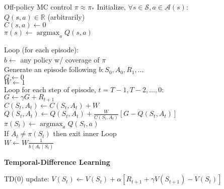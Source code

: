 \documentclass[twocolumn]{article}
\DeclareMathOperator*{\argmax}{argmax}
\begin{document}
\begin{mydef}{Off-policy MC control $\pi \approx \pi_*$}{}
    Initialize, $\forall s \in \mathcal S, a \in \mathcal A(s)$: \\
        \hspace*{2em}$Q(s,a) \in \mathbb R$ (arbitrarily) \\
        \hspace*{2em}$C(s,a) \leftarrow 0$ \\
        \hspace*{2em}$\pi(s) \leftarrow \argmax_a Q(s, a)$
    
        Loop (for each episode): \\
            \hspace*{2em}$b\leftarrow$ any policy w/ coverage of $\pi$ \\
            \hspace*{2em}Generate an episode following $b: S_0, A_0, R_1, \dots$ \\
            \hspace*{2em}$G \leftarrow 0$ \\
            \hspace*{2em}$W \leftarrow 1$ \\
            \hspace*{2em}Loop for each step of episode, $t = T-1, T-2, \dots, 0$: \\
                \hspace*{4em}$G \leftarrow \gamma G + R_{t+1}$ \\
                \hspace*{4em}$C(S_t, A_t) \leftarrow C(S_t, A_t) + W$ \\
                \hspace*{4em}$Q(S_t, A_t) \leftarrow Q(S_t, A_t) + \frac{W}{C(S_t, A_t)} [G - Q(S_t, A_t)]$ \\
                \hspace*{4em}$\pi(S_t) \leftarrow \argmax_a Q(S_t, a)$ \\
                \hspace*{4em}If $A_t \neq \pi(S_t)$ then exit inner Loop \\
                \hspace*{4em}$W \leftarrow W \frac{1}{b(A_t \mid S_t)}$
\end{mydef}

\dotfill

\textbf{Temporal-Difference Learning}

TD(0) update: $V(S_t) \leftarrow V(S_t) + \alpha [R_{t+1} + \gamma V(S_{t+1}) - V(S_t)]$
\end{document}
